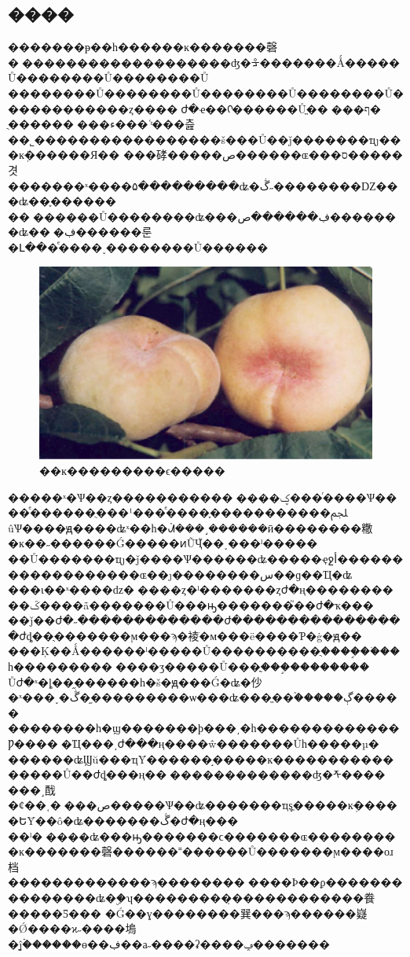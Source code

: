\documentclass[a4paper,UTF8]{ctexart} %
\begin{document}
\begin{CJK*}{GBK}{song}
\begin{multicols}{2}
\section{����}
����\supercite{Wu,Xuan}���ᵽ��һ������ĸ�������磬�󿪱�������������������ʤ�ᡱ�������Ǻ�����Ů��������Ů��������Ů
��������Ů��������Ů��������Ů��������Ů������������ȥ����԰ժ�ҽ��ᡣ������Ůֱ��԰���ף�
ֻ������԰���ء���ʿͬ���츮��˾�����������������š���Ů��ǰ�������ҵȷ���ĸּܲ������Я��
���硣�����ص������ɶ���ס�����겻�������ˣ����۵���������ʥ�ڴ˶��������Ǳ���ʥ��֪������
��԰������Ů��������ʥ���ڣ������ص�������ʥ��԰�ڣ������룬�Լ���ͤ����˯��������Ů������
\begin{figure}
\centering
\includegraphics[width=12cm]{Pantao.jpg}
\caption{��ĸ���������ϵ�����}\label{fig2}
\end{figure}
�����ˣ�Ѱ��ȥ�����������󡣡����ؼ���ͬ����Ѱ����ͤ������ֻ���¹���ͤ����֪�����������ﶼ
ûѰ����ԭ����ʥˣ��һ�ᣬ���˼������ӣ��������糤�ĸ��˶������Ǵ�����ͷŨҶ֮��˯���ˡ�����
��Ů�������ҵȷ�ּǰ����Ѱ������ʥ�����ҿջأ������������������ɶ��ȷ�ּ�������س��ɡ��Ҵ�ʥ
���ι��ˣ����ǳ�԰����ȥ�ˡ�������ȥժ�ң����������ػ����ǡ�������Ů���ԣ�������֮��ժ�ҡ���
��ǰ��ժ�˶�������������ժ����������������ժȡ��ֻ�������ϻ���ϡ�裬ֹ�м���ë����Ƥ�ġ�ԭ��
���Ķ��Ǻ������ˡ�����Ů����������ֻ����֦��ֹ��һ���������׵����ӡ�����Ů���ֳ���֦��������
Ůժ�ˣ�ȴ��֦������һ�š�ԭ���Ǵ�ʥ�仯�ˣ���˯�ڴ�֦���������ѡ���ʥ���ֱ��࣬�����ڳ�����
��������һ�ϣ�������ϸ���͵�һ�������������Ƿ�����Ҵ���͵ժ���ң����ŵ�������Ůһ�����µ�
������ʥϢŭ���ҵȲ������֣�����ĸ����������������Ů��ժȡ���ң��󿪱�������������ʤ�ᡯ����
���˼䣬�ȼ��˱�԰���ص�����Ѱ��ʥ�������ҵȿֳ�����ĸּܲ�����ԵȲ��ô�ʥ�������ڴ�ժ�ң���
��ˡ�����ʥ���ԣ�������ϲ�������ɶ���������ĸ�������磬������˭������Ů�������ϻ����оɹ档
�������������ϡ��������޺����Ϸ��ϼ���������������ʥ�ۣ�ʮ���������̣������������飬�����Ƽ���
�Ǵ��ɣ��������巽���ϡ������嶷�Ǿ����ϰ˶����塢�ĵۡ�̫�����ɵ��ڣ��а˶����ʡ����ݡ�������

\end{multicols}
\end{CJK*}
\end{document}
